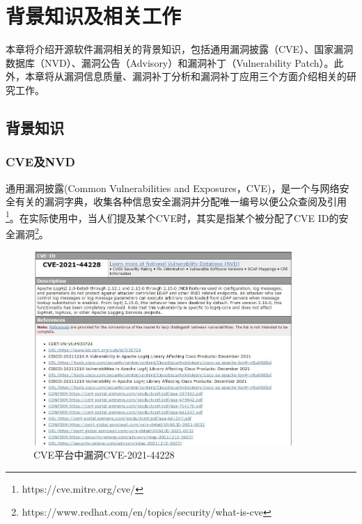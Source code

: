 \chapter{背景知识及相关工作}
本章将介绍开源软件漏洞相关的背景知识，包括通用漏洞披露（CVE）、国家漏洞数据库（NVD）、漏洞公告（Advisory）和漏洞补丁（Vulnerability Patch）。此外，本章将从漏洞信息质量、漏洞补丁分析和漏洞补丁应用三个方面介绍相关的研究工作。


\section{背景知识}

\subsection{CVE及NVD} 
通用漏洞披露(Common Vulnerabilities and Exposures，CVE)\cite{mitre2021:cve}，是一个与网络安全有关的漏洞字典，收集各种信息安全漏洞并分配唯一编号以便公众查阅及引用\footnote{https://cve.mitre.org/cve/}。在实际使用中，当人们提及某个CVE时，其实是指某个被分配了CVE ID的安全漏洞\footnote{https://www.redhat.com/en/topics/security/what-is-cve}。
\begin{figure}[h]
    \centering
    \includegraphics[width=0.88\textwidth]{fig/CVE-2021-44228-2}
    \caption{CVE平台中漏洞CVE-2021-44228}
    \label{fig:CVE-2021-44228}
\end{figure}

